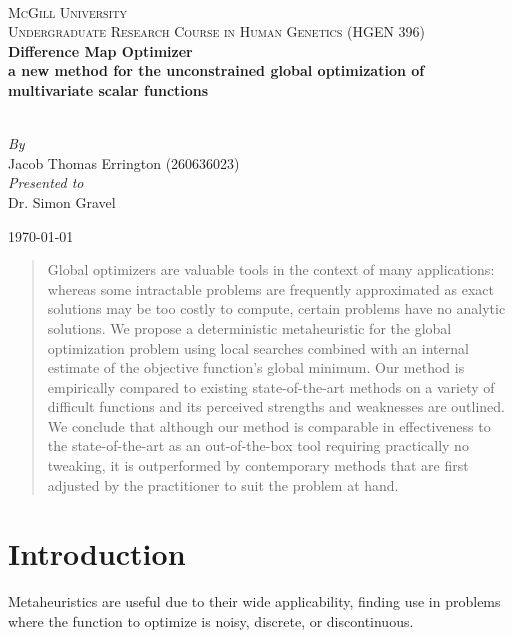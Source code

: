 \documentclass[12pt]{article}
\begin{document}
\begin{titlepage}
    \begin{center}
        ~\\[2.0cm]

        \textsc{\LARGE McGill University}\\[1.5cm]

        \textsc{\Large Undergraduate Research Course in Human Genetics (HGEN 396)}\\[1.0cm]

        {\huge \bfseries Difference Map Optimizer \\ a new method for the unconstrained global optimization of multivariate scalar functions}

        ~\\[2.0cm]

        \emph{By}\\
        Jacob Thomas Errington (260636023)\\[1.0cm]

        \emph{Presented to}\\
        Dr. Simon Gravel

        \vfill

        \today
    \end{center}
\end{titlepage}

\begin{abstract}
    Global optimizers are valuable tools in the context of many applications:
    whereas some intractable problems are frequently approximated as exact
    solutions may be too costly to compute, certain problems have no analytic
    solutions.
    We propose a deterministic metaheuristic for the global optimization
    problem using local searches combined with an internal estimate of the
    objective function's global minimum.
    Our method is empirically compared to existing state-of-the-art methods on
    a variety of difficult functions and its perceived strengths and weaknesses
    are outlined.
    We conclude that although our method is comparable in effectiveness to the
    state-of-the-art as an out-of-the-box tool requiring practically no
    tweaking, it is outperformed by contemporary methods that are first
    adjusted by the practitioner to suit the problem at hand.
\end{abstract}

\section{Introduction}
    Metaheuristics are useful due to their wide applicability, finding use in
    problems where the function to optimize is noisy, discrete, or
    discontinuous.
\end{document}
